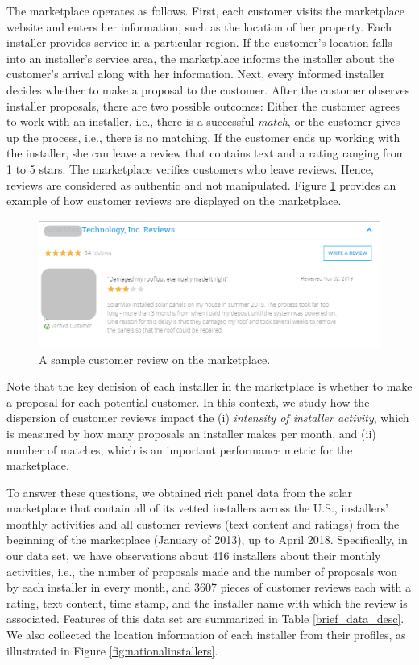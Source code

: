 \documentclass[msom,blindrev]{informs3}
\begin{document}
The marketplace operates as follows. First, each customer visits the marketplace website and enters her information, such as the location of her property. Each installer provides service in a particular region. If the customer's location falls into an installer's service area, the marketplace informs the installer about the customer's arrival along with her information. Next, every informed installer decides whether to make a proposal to the customer. After the customer observes installer proposals, there are two possible outcomes: Either the customer agrees to work with an installer, i.e., there is a successful \emph{match}, or the customer gives up the process, i.e., there is no matching. If the customer ends up working with the installer, she can leave a review that contains text and a rating ranging from 1 to 5 stars. The marketplace verifies customers who leave reviews. Hence, reviews are considered as authentic and not manipulated. Figure \ref{reviews_example} provides an example of how customer reviews are displayed on the marketplace.


\begin{figure}
	\centering
	\includegraphics[width=0.81\linewidth]{reviews_example.png}
	\caption{A sample customer review on the marketplace.}
	\label{reviews_example}
\end{figure}

Note that the key decision of each installer in the marketplace is whether to make a proposal for each potential customer.
 In this context, we study how the dispersion of customer reviews impact the (i) \emph{intensity of installer activity}, which is measured by how many proposals an installer makes per month, and (ii) number of matches, which is an important performance metric for the marketplace.

To answer these questions, we obtained rich panel data from the solar marketplace that contain all of its vetted installers across the U.S., installers' monthly activities and all customer reviews (text content and ratings) from the beginning of the marketplace (January of 2013), up to April 2018. Specifically, in our data set, we have observations about 416 installers about their monthly activities, i.e., the number of proposals made and the number of proposals won by each installer in every month, and 3607 pieces of customer reviews each with a rating, text content, time stamp, and the installer name with which the review is associated. Features of this data set are summarized in Table \ref{brief_data_desc}. We also collected the location information of each installer from their profiles, as illustrated in Figure \ref{fig:nationalinstallers}.
\end{document}

